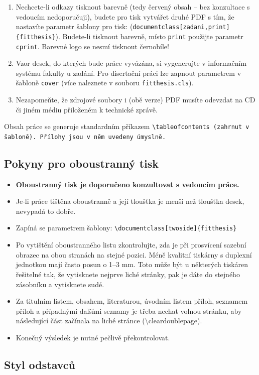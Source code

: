\begin{enumerate}
  \item Nechcete-li odkazy tisknout barevně (tedy červený obsah -- bez konzultace s vedoucím nedoporučuji), budete pro tisk vytvářet druhé PDF s tím, že nastavíte parametr šablony pro tisk: (\verb|documentclass[zadani,print]{fitthesis}|). Budete-li tisknout barevně, místo \texttt{print} použijte parametr \texttt{cprint}. Barevné logo se nesmí tisknout černobíle!
  \item Vzor desek, do kterých bude práce vyvázána, si vygenerujte v informačním systému fakulty u zadání. Pro disertační práci lze zapnout parametrem v šabloně \texttt{cover} (více naleznete v souboru \texttt{fitthesis.cls}).
  \item Nezapomeňte, že zdrojové soubory i (obě verze) PDF musíte odevzdat na CD či jiném médiu přiloženém k technické zprávě.
\end{enumerate}

Obsah práce se generuje standardním příkazem \tt \textbackslash tableofcontents \rm (zahrnut v šabloně). Přílohy jsou v něm uvedeny úmyslně.

\subsection*{Pokyny pro oboustranný tisk}
\begin{itemize}
\item \textbf{Oboustranný tisk je doporučeno konzultovat s vedoucím práce.}
\item Je-li práce tištěna oboustranně a její tloušťka je menší než tloušťka desek, nevypadá to dobře.
\item Zapíná se parametrem šablony: \verb|\documentclass[twoside]{fitthesis}|
\item Po vytištění oboustranného listu zkontrolujte, zda je při prosvícení sazební obrazec na obou stranách na stejné pozici. Méně kvalitní tiskárny s duplexní jednotkou mají často posun o 1--3 mm. Toto může být u některých tiskáren řešitelné tak, že vytisknete nejprve liché stránky, pak je dáte do stejného zásobníku a vytisknete sudé.
\item Za titulním listem, obsahem, literaturou, úvodním listem příloh, seznamem příloh a případnými dalšími seznamy je třeba nechat volnou stránku, aby následující část začínala na liché stránce (\textbackslash cleardoublepage).
\item  Konečný výsledek je nutné pečlivě překontrolovat.
\end{itemize}

\subsection*{Styl odstavců}

